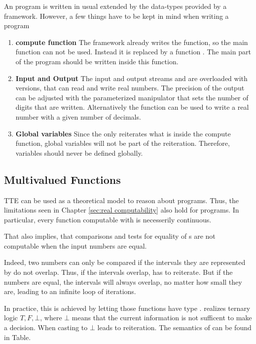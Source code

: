 		An \irram program is written in usual \cc extended by the data-types provided by a framework.
		However, a few things have to be kept in mind when writing a program
		\begin{enumerate}
      \item \textbf{compute function}
        The \irram framework already writes the \cpp {} function, so
        the main function can not be used.
        Instead it is replaced by a function .
        The main part of the program should be written inside this function.
      \item \textbf{Input and Output}
        The input and output streams  and  are overloaded
        with \irram versions, that can read and write real numbers. 
        The precision of the output can be adjusted with the parameterized
        manipulator  that sets the number of digits that are
        written. 
        Alternatively the function  can be used
        to write a real number with a given number of decimals.
      \item \textbf{Global variables} Since the \irram only reiterates what is
        inside the compute function, global variables will not be part of the
        reiteration. Therefore, \real variables should never be defined
        globally.
		\end{enumerate}
	\subsection{Multivalued Functions}
		TTE can be used as a theoretical model to reason about \irram programs.
		Thus, the limitations seen in Chapter \ref{sec:real computability} also hold for \irram programs.  
		In particular, every function computable with \irram is necesserily continuous.
		
		That also implies, that comparisons and tests for equality of {\real}s are not computable when the input numbers are equal.

		Indeed, two numbers can only be compared if the intervals they are represented by do not overlap. 
		Thus, if the intervals overlap, \irram has to reiterate. But if the numbers are equal, the intervals will always overlap, 
		no matter how small they are, leading to an infinite loop of iterations.
		
		In practice, this is achieved by letting those functions have type .
 		 realizes ternary logic
		$T, F,\bot$, where $\bot$ means that the current information is not sufficent to make a decision.
		When casting to  $\bot$ leads to reiteration. The semantics of  can be found in Table.

